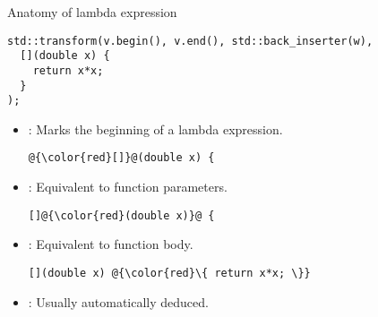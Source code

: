 \begin{frame}[t,fragile]{Anatomy of lambda expression}
\begin{lstlisting}
std::transform(v.begin(), v.end(), std::back_inserter(w),
  [](double x) { 
    return x*x; 
  }
);
\end{lstlisting}

\begin{itemize}
  \pause
  \item {}: 
        Marks the beginning of a lambda expression.
\begin{lstlisting}[escapechar=@]
@{\color{red}[]}@(double x) {
\end{lstlisting}

  \pause
  \item {}: 
        Equivalent to function parameters.
\begin{lstlisting}[escapechar=@]
[]@{\color{red}(double x)}@ {
\end{lstlisting}

  \pause
  \item {}: 
        Equivalent to function body.
\begin{lstlisting}[escapechar=@]
[](double x) @{\color{red}\{ return x*x; \}}
\end{lstlisting}

  \pause
  \item {}: 
        Usually automatically deduced.
\end{itemize}
\end{frame}

